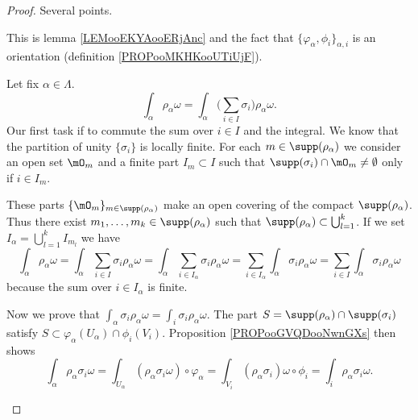 \begin{proof}
	Several points.
	\begin{subproof}
		This is lemma \ref{LEMooEKYAooERjAnc} and the fact that \( \{ \varphi_{\alpha},\phi_i \}_{\alpha,i}\) is an orientation (definition \ref{PROPooMKHKooUTiUjF}).

		Let fix \( \alpha\in\Lambda\).
		\begin{equation}
			\int_{\alpha}\rho_{\alpha}\omega=\int_{\alpha}\big( \sum_{i\in I}\sigma_i \big)\rho_{\alpha}\omega.
		\end{equation}
		Our first task if to commute the sum over \( i\in I\) and the integral. We know that the partition of unity \( \{ \sigma_i \}\) is locally finite. For each \( m\in\supp(\rho_{\alpha}) \) we consider an open set \( \mO_m\) and a finite part \( I_m\subset I\) such that \( \supp(\sigma_i)\cap\mO_m\neq \emptyset\) only if \( i\in I_m\).

		These parts \( \{ \mO_m \}_{m\in\supp(\rho_{\alpha})}\) make an open covering of the compact \( \supp(\rho_{\alpha})\). Thus there exist \( m_1,\ldots,m_k\in \supp(\rho_{\alpha})\) such that \( \supp(\rho_{\alpha})\subset \bigcup_{l=1}^{k}\). If we set \( I_{\alpha}=\bigcup_{l=1}^kI_{m_l}\) we have
		\begin{equation}		\label{EQooEFMZooDbTpOl}
			\int_{\alpha}\rho_{\alpha}\omega=\int_{\alpha}\sum_{i\in I}\sigma_i\rho_{\alpha}\omega= \int_{\alpha}\sum_{i\in I_{\alpha}}\sigma_i\rho_{\alpha}\omega=\sum_{i\in I_{\alpha}}\int_{\alpha}\sigma_i\rho_{\alpha}\omega=\sum_{i\in I}\int_{\alpha}\sigma_i\rho_{\alpha}\omega
		\end{equation}
		because the sum over \( i\in I_{\alpha}\) is finite.

		Now we prove that \( \int_{\alpha}\sigma_i\rho_{\alpha}\omega=\int_i\sigma_i\rho_{\alpha}\omega\). The part \( S=\supp(\rho_{\alpha})\cap \supp(\sigma_i)\) satisfy \( S\subset\varphi_{\alpha}(U_{\alpha})\cap \phi_i(V_i)\). Proposition \ref{PROPooGVQDooNwnGXs} then shows
		\begin{equation}		\label{EQooQWHLooThOixK}
			\int_{\alpha}\rho_{\alpha}\sigma_i\omega=\int_{U_{\alpha}}(\rho_{\alpha}\sigma_i\omega)\circ\varphi_{\alpha}=\int_{V_i}(\rho_{\alpha}\sigma_i)\omega \circ\phi_i=\int_i\rho_{\alpha}\sigma_i\omega.
		\end{equation}


\end{subproof}
\end{proof}
